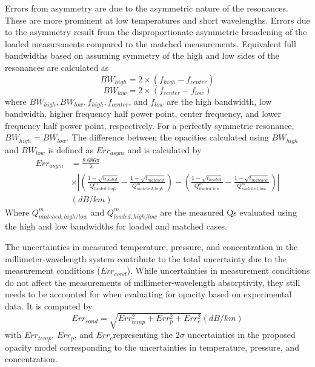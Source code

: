 Errors from asymmetry are due to the asymmetric nature of the resonances. These are more prominent at low temperatures and short wavelengths. Errors due to the asymmetry result from the disproportionate asymmetric broadening of the loaded measurements compared to the matched measurements. Equivalent full bandwidths based on assuming symmetry of the high and low sides of the resonances are calculated as
\begin{equation}
BW_{high} = 2 \times (f_{high} - f_{center})
\end{equation}
\begin{equation}
BW_{low} = 2 \times (f_{center} - f_{low})
\end{equation}
where $BW_{high}, BW_{low}, f_{high}, f_{center}$, and $f_{low}$ are the high bandwidth, low bandwidth, higher frequency half power point, center frequency, and lower frequency half power point, respectively. For a perfectly symmetric resonance, $BW_{high} = BW_{low}$. The difference between the opacities calculated using $BW_{high}$ and $BW_{low}$ is defined as $Err_{asym}$ and is calculated by
\begin{equation}
\begin{split}
Err_{asym} &= \frac{8.686 \pi}{\lambda} 
\\ &\times \left| \left( \frac{1-\sqrt{t_{loaded}}}{Q^m_{loaded,high}} - \frac{1-\sqrt{t_{matched}}}{Q^m_{matched,high}} \right) - \left( \frac{1-\sqrt{t_{loaded}}}{Q^m_{loaded,low}} - \frac{1-\sqrt{t_{matched}}}{Q^m_{matched,low}} \right) \right|\\
 &(dB/km)
\end{split}
\end{equation}
Where $Q^m_{matched,high/low}$ and $Q^m_{loaded,high/low}$ are the measured Qs evaluated using the high and low bandwidths for loaded and matched cases. 

The uncertainties in measured temperature, pressure, and concentration in the millimeter-wavelength system contribute to the total uncertainty due to the measurement conditions ($Err_{cond}$). While uncertainties in measurement conditions do not affect the measurements of millimeter-wavelength absorptivity, they still needs to be accounted for when evaluating for opacity based on experimental data. It is computed by
\begin{equation}
Err_{cond} = \sqrt{Err_{temp}^2 + Err_{p}^2 + Err_{c}^2 } (dB/km)
\end{equation}
with $Err_{temp}$, $Err_{p} $, and $ Err_{c}$representing the 2$\sigma$ uncertainties in the proposed opacity model corresponding to the uncertainties in temperature, pressure, and concentration. 

